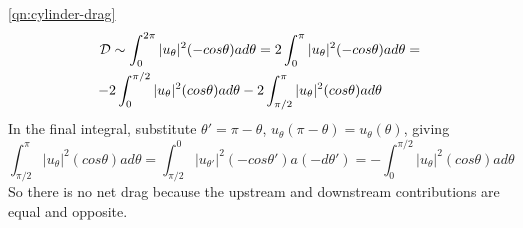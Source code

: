 \documentclass[10pt]{report}
\begin{document}
\begin{answer7}
\begin{questionnumber}{\ref{qn:cylinder-drag}}
	\begin{multline*}
		{\cal D} \sim
	             \int_{0}^{2\pi} |u_{\theta}|^{2} (-cos\theta) a d\theta =
		       2 \int_{0}^{ \pi} |u_{\theta}|^{2} (-cos\theta) a d\theta = \\
		       -2 \int_{0}^{ \pi/2} |u_{\theta}|^{2} (cos\theta) a d\theta
		       -2 \int_{\pi/2}^{\pi} |u_{\theta}|^{2} (cos\theta) a d\theta \hspace*{1cm}
	\end{multline*}
	In the final integral, substitute $\theta' = \pi - \theta$, $u_{\theta}(\pi-\theta) = u_{\theta}(\theta)$, giving
	\[
	   \int_{\pi/2}^{\pi} |u_{\theta}|^{2} (cos\theta) a d\theta =
	   \int_{\pi/2}^{0} |  u_{\theta'}|^{2} (-cos\theta') a (-d\theta') =
	   -   \int_{0}^{\pi/2} |u_{\theta}|^{2} (cos\theta) a d\theta
	\]
	So there is no net drag because the upstream and downstream contributions
	are equal and opposite.

\end{questionnumber}
\end{answer7}
\end{document}
